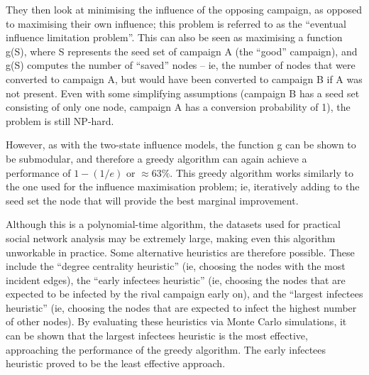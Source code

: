 They then look at minimising the influence of the opposing campaign, as opposed to maximising their own influence; this problem is referred to as the ``eventual influence limitation problem''. This can also be seen as maximising a function g(S), where S represents the seed set of campaign A (the ``good'' campaign), and g(S) computes the number of ``saved'' nodes -- ie, the number of nodes that were converted to campaign A, but would have been converted to campaign B if A was not present. Even with some simplifying assumptions (campaign B has a seed set consisting of only one node, campaign A has a conversion probability of 1), the problem is still NP-hard.

However, as with the two-state influence models, the function g can be shown to be submodular, and therefore a greedy algorithm can again achieve a performance of \(1-(1/e)\) or \(\approx63\%\). This greedy algorithm works similarly to the one used for the influence maximisation problem; ie, iteratively adding to the seed set the node that will provide the best marginal improvement.

Although this is a polynomial-time algorithm, the datasets used for practical social network analysis may be extremely large, making even this algorithm unworkable in practice. Some alternative heuristics are therefore possible. These include the ``degree centrality heuristic'' (ie, choosing the nodes with the most incident edges), the ``early infectees heuristic'' (ie, choosing the nodes that are expected to be infected by the rival campaign early on), and the ``largest infectees heuristic'' (ie, choosing the nodes that are expected to infect the highest number of other nodes). By evaluating these heuristics via Monte Carlo simulations, it can be shown that the largest infectees heuristic is the most effective, approaching the performance of the greedy algorithm. The early infectees heuristic proved to be the least effective approach.

